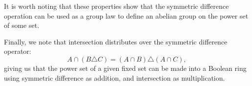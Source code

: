 \documentclass[12pt]{article}
\newcommand{\symd}{\triangle}
\begin{document}
It is worth noting that these properties show that the symmetric difference operation can be used as a group law to define an abelian group on the power set of some  set.  

Finally, we note that intersection distributes over the symmetric difference operator: $$A\cap(B\symd C)=(A\cap B)\symd(A\cap C),$$ giving us that the power set of a given fixed set can be made into a Boolean ring using symmetric difference as addition, and intersection as multiplication.
\end{document}
